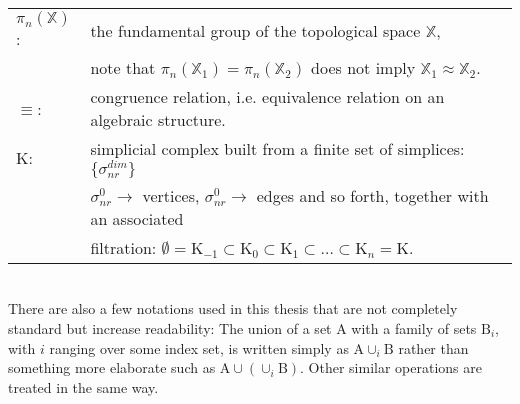 \begin{table}[htpb]
\begin{tabular}{ l l }
	$\pi_{n}(\mathbb{X})$: & the fundamental group of the topological space $\mathbb{X}$,\\ & note that $\pi_{n}(\mathbb{X}_{1}) = \pi_{n}(\mathbb{X}_{2})$ does not imply $\mathbb{X}_{1} \approx \mathbb{X}_{2}$.\\
	$\equiv$: & congruence relation, i.e. equivalence relation on an algebraic structure.\\
	$\mathrm{K}$: & simplicial complex built from a finite set of simplices: $\{ \sigma^{dim}_{nr} \}$\\ & $\sigma^{0}_{nr} \rightarrow$ vertices, $\sigma^{0}_{nr} \rightarrow$ edges and so forth, together with an associated \\ & filtration: $ \emptyset = \mathrm{K}_{-1} \subset \mathrm{K}_{0} \subset \mathrm{K}_{1} \subset \dots \subset \mathrm{K}_{n} = \mathrm{K}$.\\
\end{tabular}
\end{table}\\
There are also a few notations used in this thesis that are not completely standard but increase readability:
The union of a set $\mathrm{A}$ with a family of sets $\mathrm{B}_{i}$, with $i$ ranging over some index set, is written simply as $\mathrm{A} \cup_{i} \mathrm{B}$ rather than something more elaborate such as $\mathrm{A} \cup (\cup_{i} \mathrm{B})$. Other similar operations are treated in the same way.
